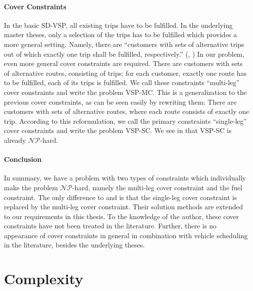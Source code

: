 \paragraph{Cover Constraints} \parfill

In the basic SD-VSP, all existing trips have to be fulfilled. In the underlying master theses, only a selection of the trips has to be fulfilled which provides a more general setting. Namely, there are \enquote{customers with sets of alternative trips out of which exactly one trip shall be fulfilled, respectively.} (\cite[p.~10]{Kaiser}, \cite[p.~10]{Knoll}) In our problem, even more general cover constraints are required. There are customers with sets of alternative routes, consisting of trips; for each customer, exactly one route has to be fulfilled, \ie each of its trips is fulfilled. We call these constraints \enquote{multi-leg} cover constraints and write the problem VSP-MC. This is a generalization to the previous cover constraints, as can be seen easily by rewriting them: There are customers with sets of alternative routes, where each route consists of exactly one trip. According to this reformulation, we call the primary constraints \enquote{single-leg} cover constraints and write the problem VSP-SC. We see in  that VSP-SC is already $\mathcal{NP}$-hard.

\paragraph{Conclusion} \parfill

In summary, we have a problem with two types of constraints which individually make the problem $\mathcal{NP}$-hard, namely the multi-leg cover constraint and the fuel constraint. The only difference to \cite{Kaiser} and \cite{Knoll} is that the single-leg cover constraint is replaced by the multi-leg cover constraint. Their solution methods are extended to our requirements in this thesis. To the knowledge of the author, these cover constraints have not been treated in the literature. Further, there is no appearance of cover constraints in general in combination with vehicle scheduling in the literature, besides the underlying theses. 


\section{Complexity}
\label{sec:complexity}

